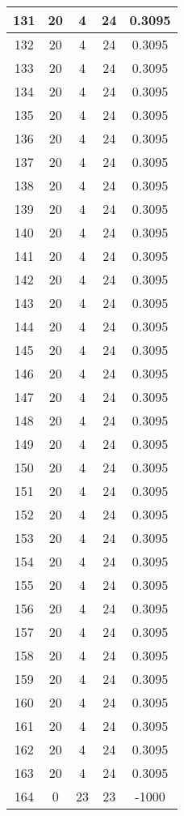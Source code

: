 \documentclass[letterpaper, 12pt]{article}
\begin{document}
\begin{longtable}{|c|c|c|c|c|}
\hline
131 & 20 & 4 & 24 & 0.3095 \\
\hline
132 & 20 & 4 & 24 & 0.3095 \\
\hline
133 & 20 & 4 & 24 & 0.3095 \\
\hline
134 & 20 & 4 & 24 & 0.3095 \\
\hline
135 & 20 & 4 & 24 & 0.3095 \\
\hline
136 & 20 & 4 & 24 & 0.3095 \\
\hline
137 & 20 & 4 & 24 & 0.3095 \\
\hline
138 & 20 & 4 & 24 & 0.3095 \\
\hline
139 & 20 & 4 & 24 & 0.3095 \\
\hline
140 & 20 & 4 & 24 & 0.3095 \\
\hline
141 & 20 & 4 & 24 & 0.3095 \\
\hline
142 & 20 & 4 & 24 & 0.3095 \\
\hline
143 & 20 & 4 & 24 & 0.3095 \\
\hline
144 & 20 & 4 & 24 & 0.3095 \\
\hline
145 & 20 & 4 & 24 & 0.3095 \\
\hline
146 & 20 & 4 & 24 & 0.3095 \\
\hline
147 & 20 & 4 & 24 & 0.3095 \\
\hline
148 & 20 & 4 & 24 & 0.3095 \\
\hline
149 & 20 & 4 & 24 & 0.3095 \\
\hline
150 & 20 & 4 & 24 & 0.3095 \\
\hline
151 & 20 & 4 & 24 & 0.3095 \\
\hline
152 & 20 & 4 & 24 & 0.3095 \\
\hline
153 & 20 & 4 & 24 & 0.3095 \\
\hline
154 & 20 & 4 & 24 & 0.3095 \\
\hline
155 & 20 & 4 & 24 & 0.3095 \\
\hline
156 & 20 & 4 & 24 & 0.3095 \\
\hline
157 & 20 & 4 & 24 & 0.3095 \\
\hline
158 & 20 & 4 & 24 & 0.3095 \\
\hline
159 & 20 & 4 & 24 & 0.3095 \\
\hline
160 & 20 & 4 & 24 & 0.3095 \\
\hline
161 & 20 & 4 & 24 & 0.3095 \\
\hline
162 & 20 & 4 & 24 & 0.3095 \\
\hline
163 & 20 & 4 & 24 & 0.3095 \\
\hline
164 & 0 & 23 & 23 & -1000 \\

\end{longtable}
\end{document}
